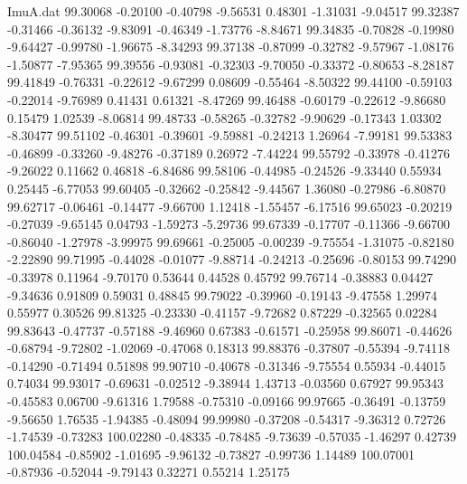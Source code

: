 \begin{filecontents}{ImuA.dat}
  99.30068   -0.20100   -0.40798   -9.56531    0.48301   -1.31031   -9.04517
  99.32387   -0.31466   -0.36132   -9.83091   -0.46349   -1.73776   -8.84671
  99.34835   -0.70828   -0.19980   -9.64427   -0.99780   -1.96675   -8.34293
  99.37138   -0.87099   -0.32782   -9.57967   -1.08176   -1.50877   -7.95365
  99.39556   -0.93081   -0.32303   -9.70050   -0.33372   -0.80653   -8.28187
  99.41849   -0.76331   -0.22612   -9.67299    0.08609   -0.55464   -8.50322
  99.44100   -0.59103   -0.22014   -9.76989    0.41431    0.61321   -8.47269
  99.46488   -0.60179   -0.22612   -9.86680    0.15479    1.02539   -8.06814
  99.48733   -0.58265   -0.32782   -9.90629   -0.17343    1.03302   -8.30477
  99.51102   -0.46301   -0.39601   -9.59881   -0.24213    1.26964   -7.99181
  99.53383   -0.46899   -0.33260   -9.48276   -0.37189    0.26972   -7.44224
  99.55792   -0.33978   -0.41276   -9.26022    0.11662    0.46818   -6.84686
  99.58106   -0.44985   -0.24526   -9.33440    0.55934    0.25445   -6.77053
  99.60405   -0.32662   -0.25842   -9.44567    1.36080   -0.27986   -6.80870
  99.62717   -0.06461   -0.14477   -9.66700    1.12418   -1.55457   -6.17516
  99.65023   -0.20219   -0.27039   -9.65145    0.04793   -1.59273   -5.29736
  99.67339   -0.17707   -0.11366   -9.66700   -0.86040   -1.27978   -3.99975
  99.69661   -0.25005   -0.00239   -9.75554   -1.31075   -0.82180   -2.22890
  99.71995   -0.44028   -0.01077   -9.88714   -0.24213   -0.25696   -0.80153
  99.74290   -0.33978    0.11964   -9.70170    0.53644    0.44528    0.45792
  99.76714   -0.38883    0.04427   -9.34636    0.91809    0.59031    0.48845
  99.79022   -0.39960   -0.19143   -9.47558    1.29974    0.55977    0.30526
  99.81325   -0.23330   -0.41157   -9.72682    0.87229   -0.32565    0.02284
  99.83643   -0.47737   -0.57188   -9.46960    0.67383   -0.61571   -0.25958
  99.86071   -0.44626   -0.68794   -9.72802   -1.02069   -0.47068    0.18313
  99.88376   -0.37807   -0.55394   -9.74118   -0.14290   -0.71494    0.51898
  99.90710   -0.40678   -0.31346   -9.75554    0.55934   -0.44015    0.74034
  99.93017   -0.69631   -0.02512   -9.38944    1.43713   -0.03560    0.67927
  99.95343   -0.45583    0.06700   -9.61316    1.79588   -0.75310   -0.09166
  99.97665   -0.36491   -0.13759   -9.56650    1.76535   -1.94385   -0.48094
  99.99980   -0.37208   -0.54317   -9.36312    0.72726   -1.74539   -0.73283
 100.02280   -0.48335   -0.78485   -9.73639   -0.57035   -1.46297    0.42739
 100.04584   -0.85902   -1.01695   -9.96132   -0.73827   -0.99736    1.14489
 100.07001   -0.87936   -0.52044   -9.79143    0.32271    0.55214    1.25175

\end{filecontents}
